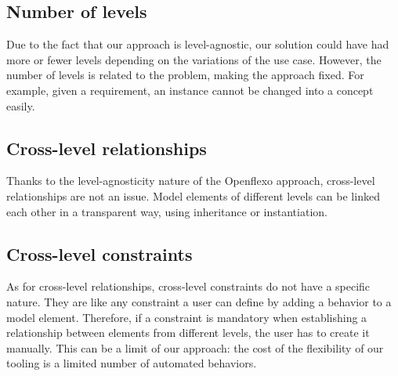 
  \subsection{Number of levels}

  Due to the fact that our approach is level-agnostic, our solution could have had more
  or fewer levels depending on the variations of the use case. However, the number of levels is related
  to the problem, making the approach fixed. For example, given a requirement, an instance cannot be 
  changed into a concept easily.

  \subsection{Cross-level relationships}


  Thanks to the level-agnosticity nature of the Openflexo approach, cross-level
  relationships are not an issue. Model elements of different levels can be
  linked each other in a transparent way, using inheritance or instantiation.

  \subsection{Cross-level constraints}


  As for cross-level relationships, cross-level constraints do not have a
  specific nature. They are like any constraint a user can define by adding a
  behavior to a model element. Therefore, if a constraint is mandatory when
  establishing a relationship between elements from different levels, the user
  has to create it manually. This can be a limit of our approach: the cost of
  the flexibility of our tooling is a limited number of automated behaviors. 
  
  

